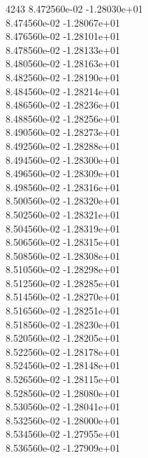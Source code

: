 4243	8.472560e-02	-1.28030e+01	\\ 	8.474560e-02	-1.28067e+01	\\ 	8.476560e-02	-1.28101e+01	\\ 	8.478560e-02	-1.28133e+01	\\ 	8.480560e-02	-1.28163e+01	\\ 	8.482560e-02	-1.28190e+01	\\ 	8.484560e-02	-1.28214e+01	\\ 	8.486560e-02	-1.28236e+01	\\ 	8.488560e-02	-1.28256e+01	\\ 	8.490560e-02	-1.28273e+01	\\ 	8.492560e-02	-1.28288e+01	\\ 	8.494560e-02	-1.28300e+01	\\ 	8.496560e-02	-1.28309e+01	\\ 	8.498560e-02	-1.28316e+01	\\ 	8.500560e-02	-1.28320e+01	\\ 	8.502560e-02	-1.28321e+01	\\ 	8.504560e-02	-1.28319e+01	\\ 	8.506560e-02	-1.28315e+01	\\ 	8.508560e-02	-1.28308e+01	\\ 	8.510560e-02	-1.28298e+01	\\ 	8.512560e-02	-1.28285e+01	\\ 	8.514560e-02	-1.28270e+01	\\ 	8.516560e-02	-1.28251e+01	\\ 	8.518560e-02	-1.28230e+01	\\ 	8.520560e-02	-1.28205e+01	\\ 	8.522560e-02	-1.28178e+01	\\ 	8.524560e-02	-1.28148e+01	\\ 	8.526560e-02	-1.28115e+01	\\ 	8.528560e-02	-1.28080e+01	\\ 	8.530560e-02	-1.28041e+01	\\ 	8.532560e-02	-1.28000e+01	\\ 	8.534560e-02	-1.27955e+01	\\ 	8.536560e-02	-1.27909e+01	\\ \hline
